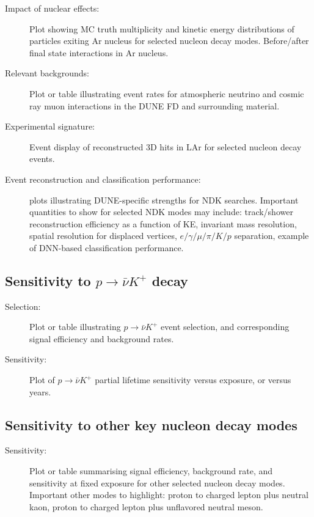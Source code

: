 \begin{description}
\item[Impact of nuclear effects:] Plot showing MC truth multiplicity and kinetic energy distributions of particles exiting Ar nucleus for selected nucleon decay modes. Before/after final state interactions in Ar nucleus.
\item[Relevant backgrounds:] Plot or table illustrating event rates for atmospheric neutrino and cosmic ray muon interactions in the DUNE FD and surrounding material.
\item[Experimental signature:] Event display of reconstructed 3D hits in LAr for selected nucleon decay events.
\item[Event reconstruction and classification performance:] plots illustrating DUNE-specific strengths for NDK searches. Important quantities to show for selected NDK modes may include: track/shower reconstruction efficiency as a function of KE, invariant mass resolution, spatial resolution for displaced vertices, $e/\gamma/\mu/\pi/K/p$ separation, example of DNN-based classification performance.  
\end{description}

\subsection{Sensitivity to $p\to\bar{\nu}K^+$ decay}
\label{subsec:nonaccel-ndk-nubarkplus}

\begin{description}
\item[Selection:] Plot or table illustrating $p\to\bar{\nu}K^+$ event selection, and corresponding signal efficiency and background rates.
\item[Sensitivity:] Plot of $p\to\bar{\nu}K^+$ partial lifetime sensitivity versus exposure, or versus years.
\end{description}

\subsection{Sensitivity to other key nucleon decay modes}
\label{subsec:nonaccel-ndk-other}

\begin{description}
\item[Sensitivity:] Plot or table summarising signal efficiency, background rate, and sensitivity at fixed exposure for other selected nucleon decay modes. Important other modes to highlight: proton to charged lepton plus neutral kaon, proton to charged lepton plus unflavored neutral meson.
\end{description}


